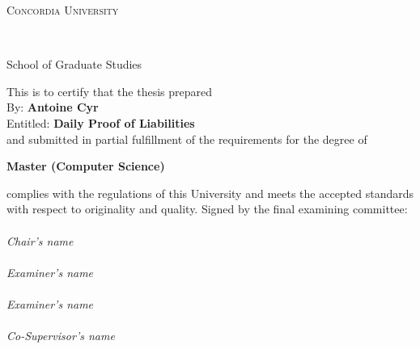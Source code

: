 
\thispagestyle{empty} %

\begin{center}\begin{Large} \textsc{Concordia University} \end{Large} \\
\begin{large} School of Graduate Studies \end{large} \end{center}
\vfill
This is to certify that the thesis prepared\\
By: \tab   \textbf{Antoine Cyr } \\
Entitled: \tab \textbf{Daily Proof of Liabilities}\\
 and submitted in partial fulfillment of the requirements for the degree of
\begin{center}
\textbf{Master (Computer Science)}
\end{center}
complies with the regulations of this University and meets the
accepted standards with respect to originality and quality.
\vfill
\noindent Signed by the final examining committee: \\[1.3em]
\hspace*{1cm} \raisebox{-0.9em}{\rlap{\it \small }}\hrulefill {} \\
\hspace*{1.5cm} \textit{Chair's name} \\[1.3em]
\hspace*{1cm} \raisebox{-0.9em}{\rlap{\it \small }}\hrulefill {} \\
\hspace*{1.5cm} \textit{Examiner's name} \\[1.3em]
\hspace*{1cm} \raisebox{-0.9em}{\rlap{\it \small }}\hrulefill {} \\
\hspace*{1.5cm} \textit{Examiner's name} \\[1.3em]
\hspace*{1cm} \raisebox{-0.9em}{\rlap{\it \small }}\hrulefill {} \\
\hspace*{1.5cm} \textit{Co-Supervisor's name} \\[1.3em]
\hspace*{1cm} \raisebox{-0.9em}{\rlap{\it \small }}\hrulefill {} \\
